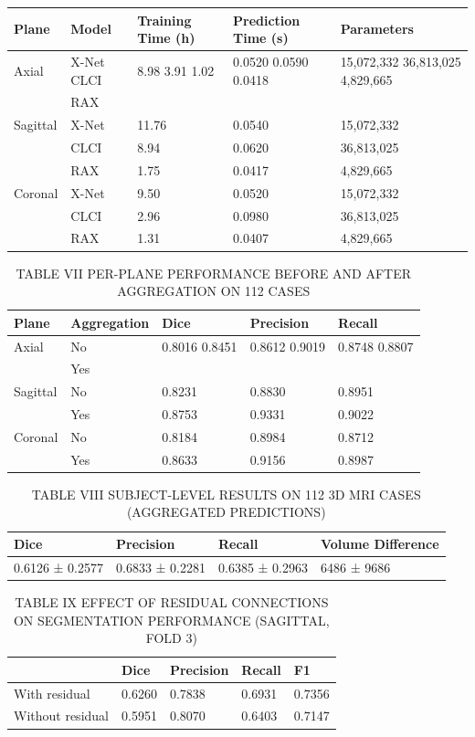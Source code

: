 \begin{table}[htbp]
\centering
\label{tab:table\_006}
\begin{tabular}{lllll}
\hline
Plane & Model & Training Time (h) & Prediction Time (s) & Parameters \\
\hline
Axial & X-Net CLCI & 8.98 3.91 1.02 & 0.0520 0.0590 0.0418 & 15,072,332 36,813,025 4,829,665 \\
 & RAX &  &  &  \\
Sagittal & X-Net & 11.76 & 0.0540 & 15,072,332 \\
 & CLCI & 8.94 & 0.0620 & 36,813,025 \\
 & RAX & 1.75 & 0.0417 & 4,829,665 \\
Coronal & X-Net & 9.50 & 0.0520 & 15,072,332 \\
 & CLCI & 2.96 & 0.0980 & 36,813,025 \\
 & RAX & 1.31 & 0.0407 & 4,829,665 \\
\hline
\end{tabular}
\end{table}

\begin{table}[htbp]
\centering
\caption{TABLE VII PER-PLANE PERFORMANCE BEFORE AND AFTER AGGREGATION ON 112 CASES}
\label{tab:table\_007}
\begin{tabular}{lllll}
\hline
Plane & Aggregation & Dice & Precision & Recall \\
\hline
Axial & No & 0.8016 0.8451 & 0.8612 0.9019 & 0.8748 0.8807 \\
 & Yes &  &  &  \\
Sagittal & No & 0.8231 & 0.8830 & 0.8951 \\
 & Yes & 0.8753 & 0.9331 & 0.9022 \\
Coronal & No & 0.8184 & 0.8984 & 0.8712 \\
 & Yes & 0.8633 & 0.9156 & 0.8987 \\
\hline
\end{tabular}
\end{table}

\begin{table}[htbp]
\centering
\caption{TABLE VIII SUBJECT-LEVEL RESULTS ON 112 3D MRI CASES (AGGREGATED PREDICTIONS)}
\label{tab:table\_008}
\begin{tabular}{llll}
\hline
Dice & Precision & Recall & Volume Difference \\
\hline
0.6126 ± 0.2577 & 0.6833 ± 0.2281 & 0.6385 ± 0.2963 & 6486 ± 9686 \\
\hline
\end{tabular}
\end{table}

\begin{table}[htbp]
\centering
\caption{TABLE IX EFFECT OF RESIDUAL CONNECTIONS ON SEGMENTATION PERFORMANCE (SAGITTAL, FOLD 3)}
\label{tab:table\_009}
\begin{tabular}{lllll}
\hline
 & Dice & Precision & Recall & F1 \\
\hline
With residual & 0.6260 & 0.7838 & 0.6931 & 0.7356 \\
Without residual & 0.5951 & 0.8070 & 0.6403 & 0.7147 \\
\hline
\end{tabular}
\end{table}
